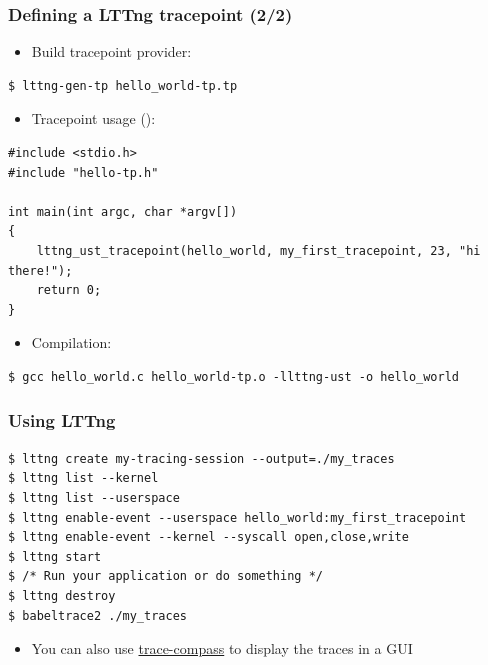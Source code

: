 \begin{frame}[fragile]
  \frametitle{Defining a LTTng tracepoint (2/2)}
  \begin{itemize}
    \item Build tracepoint provider:
  \end{itemize}
  \begin{block}{}
    \begin{verbatim}
$ lttng-gen-tp hello_world-tp.tp
   \end{verbatim}
  \end{block}
  \begin{itemize}
    \item Tracepoint usage ():
  \end{itemize}
  \begin{block}{}
    \begin{verbatim}
#include <stdio.h>
#include "hello-tp.h"

int main(int argc, char *argv[])
{
    lttng_ust_tracepoint(hello_world, my_first_tracepoint, 23, "hi there!");
    return 0;
}
   \end{verbatim}
  \end{block}
  \begin{itemize}
    \item Compilation:
  \end{itemize}
  \begin{block}{}
    \begin{verbatim}
$ gcc hello_world.c hello_world-tp.o -llttng-ust -o hello_world
   \end{verbatim}
  \end{block}
\end{frame}

\begin{frame}[fragile]
  \frametitle{Using LTTng}
  \begin{block}{}
    \begin{verbatim}
$ lttng create my-tracing-session --output=./my_traces
$ lttng list --kernel
$ lttng list --userspace
$ lttng enable-event --userspace hello_world:my_first_tracepoint
$ lttng enable-event --kernel --syscall open,close,write
$ lttng start
$ /* Run your application or do something */
$ lttng destroy
$ babeltrace2 ./my_traces
   \end{verbatim}
  \end{block}
  \begin{itemize}
    \item You can also use
    \href{https://eclipse.dev/tracecompass/trace-compass}{trace-compass}
    to display the traces in a GUI
  \end{itemize}
\end{frame}

